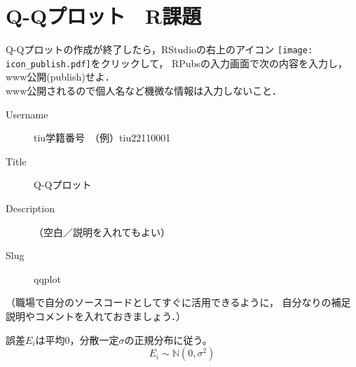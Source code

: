 \section{Q-Qプロット　R課題}

\MyFrame{\insertsection}
{
  Q-Qプロットの作成が終了したら，RStudioの右上のアイコン
  \texttt{[image: icon\_publish.pdf]}をクリックして，
  RPubsの入力画面で次の内容を入力し，www公開(publish)せよ．\\
  \alert{www公開されるので個人名など機微な情報は入力しないこと．}
  \begin{description}
    \item[Username] tiu学籍番号　（例）tiu22110001\\
    \item[Title] Q-Qプロット\\
    \item[Description] （空白／説明を入れてもよい）\\
    \item[Slug] qqplot
  \end{description}
  （職場で自分のソースコードとしてすぐに活用できるように，
    自分なりの補足説明やコメントを入れておきましょう．）
}

\MyFrame{}
{
  誤差$E_i$は平均0，分散一定$\sigma$の正規分布に従う。
  \[E_i \sim \mathbb{N}(0, \sigma^2)\]
}


